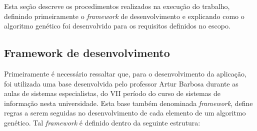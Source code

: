 \par Esta seção descreve os procedimentos realizados na execução do trabalho,
definindo primeiramente o \textit{framework} de desenvolvimento e explicando
como o algoritmo genético foi desenvolvido para os requisitos definidos no escopo.

\subsection{Framework de desenvolvimento}
\par Primeiramente é necessário ressaltar que, para o desenvolvimento da aplicação, foi utilizada uma base desenvolvida pelo professor Artur Barbosa durante as aulas de sistemas especialistas, do VII período do curso de sistemas de informação nesta universidade.
Esta base também denominada \textit{framework}, define regras a serem seguidas no desenvolvimento de cada elemento
de um algoritmo genético. Tal \textit{framework} é definido dentro da seguinte estrutura:

